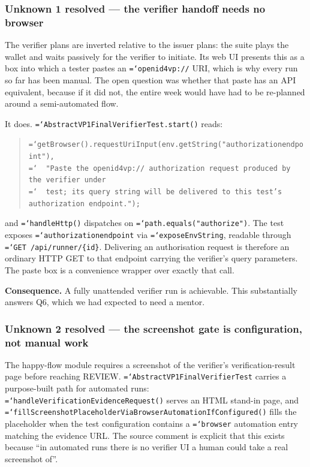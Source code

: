 \documentclass[11pt,a4paper]{article}
\let\origtexttt\texttt
\renewcommand{\texttt}[1]{\origtexttt{\hyphenchar\font=`\-\relax #1}}
\renewcommand{\_}{\textunderscore\allowbreak}
\begin{document}
\subsubsection*{Unknown 1 resolved --- the verifier handoff needs no browser}

The verifier plans are inverted relative to the issuer plans: the suite plays the wallet and
waits passively for the verifier to initiate. Its web UI presents this as a box into which a
tester pastes an \texttt{openid4vp://} URI, which is why every run so far has been manual.
The open question was whether that paste has an API equivalent, because if it did not, the
entire week would have had to be re-planned around a semi-automated flow.

It does. \texttt{AbstractVP1FinalVerifierTest.start()} reads:

\begin{quote}\small
\texttt{getBrowser().requestUriInput(env.getString("authorization\_endpoint"),}\\
\texttt{\ \ "Paste the openid4vp:// authorization request produced by the verifier under}\\
\texttt{\ \ test; its query string will be delivered to this test's authorization endpoint.");}
\end{quote}

\noindent and \texttt{handleHttp()} dispatches on \texttt{path.equals("authorize")}. The test
exposes \texttt{authorization\_endpoint} via \texttt{exposeEnvString}, readable through
\texttt{GET /api/runner/\{id\}}. Delivering an authorisation request is therefore an ordinary
HTTP GET to that endpoint carrying the verifier's query parameters. The paste box is a
convenience wrapper over exactly that call.

\textbf{Consequence.} A fully unattended verifier run is achievable. This substantially
answers Q6, which we had expected to need a mentor.

\subsubsection*{Unknown 2 resolved --- the screenshot gate is configuration, not manual work}

The happy-flow module requires a screenshot of the verifier's verification-result page before
reaching REVIEW. \texttt{AbstractVP1FinalVerifierTest} carries a purpose-built path for
automated runs: \texttt{handleVerificationEvidenceRequest()} serves an HTML stand-in page,
and \texttt{fillScreenshotPlaceholderViaBrowserAutomationIfConfigured()} fills the placeholder
when the test configuration contains a \texttt{browser} automation entry matching the
evidence URL. The source comment is explicit that this exists because ``in automated runs
there is no verifier UI a human could take a real screenshot of''.
\end{document}
